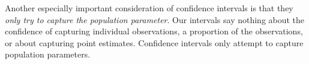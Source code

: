 Another especially important consideration of confidence intervals is that they \emph{only try to capture the population parameter}. Our intervals say nothing about the confidence of capturing individual observations, a proportion of the observations, or about capturing point estimates. Confidence intervals only attempt to capture population parameters.




